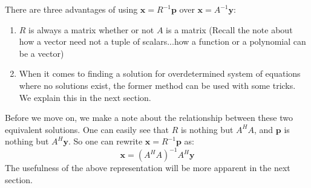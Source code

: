 There are three advantages of using \(\mathbf{x} = R^{-1}\mathbf{p}\) over \(\mathbf{x} = A^{-1}\mathbf{y}\):
	\begin{enumerate}
	\item \(R\) is always a matrix whether or not \(A\) is a matrix (Recall the note about how a vector need not a tuple of scalars...how a function or a polynomial can be a vector)
	\item When it comes to finding a solution for overdetermined system of equations where no solutions exist, the former method can be used with some tricks. We explain this in the next section.
	\end{enumerate}
Before we move on, we make a note about the relationship between these two equivalent solutions. One can easily see that \(R\) is nothing but \(A^H A\), and \(\mathbf{p}\) is nothing but \(A^H \mathbf{y}\). So one can rewrite \(\mathbf{x} = R^{-1}\mathbf{p}\) as:
	\[ \mathbf{x} = (A^H A)^{-1} A^H \mathbf{y} \]
The usefulness of the above representation will be more apparent in the next section.

